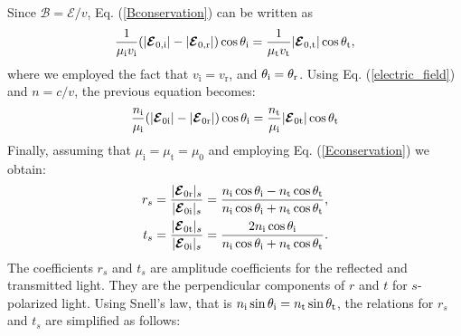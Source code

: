 Since $\boldsymbol{\mathcal{B}} = \boldsymbol{\mathcal{E}}/v$, Eq. (\ref{Bconservation}) can be written as 
\begin{equation}
\frac{1}{\mu_{\textrm{i}}v_{\textrm{i}}}(|\boldsymbol{\mathcal{E}}_{0,\textrm{i}}|-|\boldsymbol{\mathcal{E}}_{0,\textrm{r}}|)\cos\theta_{\textrm{i}} = \frac{1}{\mu_{\textrm{t}}v_{\textrm{t}}}|\boldsymbol{\mathcal{E}}_{0,\textrm{t}}|\cos\theta_{\textrm{t}},
\end{equation}
where we employed the fact that $v_{\textrm{i}}= v_{\textrm{r}}$, and $\theta_{\textrm{i}}= \theta_{\textrm{r}}$. 
Using Eq. (\ref{electric_field}) and $n = c/v$, the previous equation becomes:
\begin{equation}
\frac{n_{\textrm{i}}}{\mu_{\textrm{i}}}(|\boldsymbol{\mathcal{E}}_{0\textrm{i}}|-|\boldsymbol{\mathcal{E}}_{0\textrm{r}}|)\cos\theta_{\textrm{i}} = \frac{n_{\textrm{t}}}{\mu_{\textrm{i}}}|\boldsymbol{\mathcal{E}}_{0\textrm{t}}|\cos\theta_{\textrm{t}}
\end{equation}
Finally,  assuming that $\mu_{\textrm{i}}=\mu_{\textrm{t}}=\mu_{0}$ and employing Eq. (\ref{Econservation}) we obtain:
\begin{equation} \label{Fresnel_perpendicular}
\begin{split}
r_{s} & =\frac{|\boldsymbol{\mathcal{E}}_{0 \textrm{r}}|_{s}}{|\boldsymbol{\mathcal{E}}_{0\textrm{i}}|_s} = 
\frac{n_\textrm{i}\cos\theta_\textrm{i}-n_\textrm{t} \cos\theta_\textrm{t}}{n_\textrm{i}
\cos\theta_\textrm{i}+n_\textrm{t}\cos\theta_\textrm{t}},\\
t_{s} & = \frac{|\boldsymbol{\mathcal{E}}_{0 \textrm{t}}|_s}{|\boldsymbol{\mathcal{E}}_{0\textrm{i}}|_s} 
=\frac{2n_\textrm{i}\cos\theta_\textrm{i}}{n_\textrm{i}\cos\theta_\textrm{i}+n_\textrm{t}\cos\theta_\textrm{t}}.\\
\end{split}
\end{equation}
The coefficients $r_s$ and $t_s$ are amplitude coefficients for the reflected and transmitted light.
They are the perpendicular components of $r$ and $t$ for $s$-polarized light.
Using Snell's law, that is $n_{\textrm{i}}\sin\theta_{\textrm{i}} = n_{\textrm{t}}\sin\theta_{\textrm{t}}$, the relations for $r_s$ and $t_s$ are simplified as follows:
